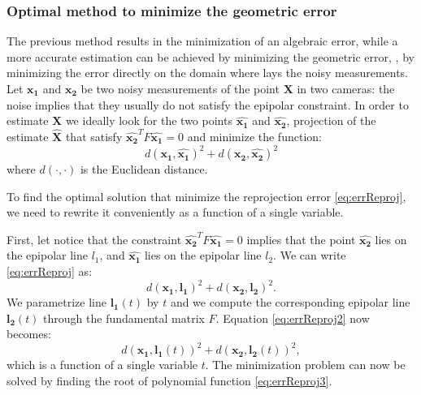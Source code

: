 \subsubsection{Optimal method to minimize the geometric error}
The previous method results in the minimization of an algebraic error, while a more accurate estimation can be achieved by minimizing the geometric error, \ie, by minimizing the error directly on the domain where lays the noisy measurements.
Let $\mathbf{x_1}$ and $\mathbf{x_2}$ be two noisy measurements of the point $\mathbf{X}$ in two cameras: the noise implies that they usually do not satisfy the epipolar constraint. In order to estimate $\mathbf{X}$ we ideally look for the two points $\hat{\mathbf{x_1}}$ and $\hat{\mathbf{x_2}}$, projection of the estimate $\hat{\mathbf{X}}$ that satisfy $\hat{\mathbf{x_2}}^{T} F \hat{\mathbf{x_1}} = 0$ and  minimize the function:
\begin{equation}
\label{eq:errReproj}
  d(\mathbf{x_1}, \hat{\mathbf{x_1}})^2 + d(\mathbf{x_2}, \hat{\mathbf{x_2}})^2
\end{equation}
where $d(\cdot,\cdot)$ is the Euclidean distance. 

To find the optimal solution that minimize the reprojection error \eqref{eq:errReproj}, we need to rewrite it conveniently as a function of a single variable.

First, let notice that the constraint $\hat{\mathbf{x_2}}^{T} F \hat{\mathbf{x_1}} = 0$ implies that the point $\hat{\mathbf{x_2}}$ lies on the epipolar line $l_1$, and $\hat{\mathbf{x_1}}$ lies on the epipolar line $l_2$. We can write \eqref{eq:errReproj} as:
\begin{equation}
\label{eq:errReproj2}
  d(\mathbf{x_1}, \mathbf{l_1})^2 + d(\mathbf{x_2}, \mathbf{l_2})^2.
\end{equation}
We parametrize line $\mathbf{l_1}(t)$ by $t$  and we compute the corresponding epipolar line $\mathbf{l_2}(t)$ through the fundamental matrix $F$. Equation \eqref{eq:errReproj2} now becomes:
\begin{equation}
\label{eq:errReproj3}
d(\mathbf{x_1}, \mathbf{l_1}(t))^2 + d(\mathbf{x_2}, \mathbf{l_2}(t))^2,
\end{equation}
which is a function of a single variable $t$. 
The minimization problem can now be solved by finding the root of polynomial function \eqref{eq:errReproj3}.

